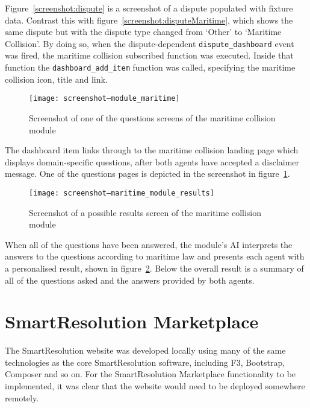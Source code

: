 Figure~\ref{screenshot:dispute} is a screenshot of a dispute populated with fixture data. Contrast this with figure~\ref{screenshot:disputeMaritime}, which shows the same dispute but with the dispute type changed from `Other' to `Maritime Collision'. By doing so, when the dispute-dependent \lstinline{dispute_dashboard} event was fired, the maritime collision subscribed function was executed. Inside that function the \lstinline{dashboard_add_item} function was called, specifying the maritime collision icon, title and link.

\begin{figure}[h!]
  \centering
    \ifimages
    \texttt{[image: screenshot--module\_maritime]}
    \fi
  \caption{Screenshot of one of the questions screens of the maritime collision module}
  \label{screenshot:moduleMaritime}
\end{figure}

The dashboard item links through to the maritime collision landing page which displays domain-specific questions, after both agents have accepted a disclaimer message. One of the questions pages is depicted in the screenshot in figure~\ref{screenshot:moduleMaritime}.

\begin{figure}[h!]
  \centering
    \ifimages
    \texttt{[image: screenshot--maritime\_module\_results]}
    \fi
  \caption{Screenshot of a possible results screen of the maritime collision module}
  \label{screenshot:moduleMaritimeResults}
\end{figure}

When all of the questions have been answered, the module's AI interprets the answers to the questions according to maritime law and presents each agent with a personalised result, shown in figure~\ref{screenshot:moduleMaritimeResults}. Below the overall result is a summary of all of the questions asked and the answers provided by both agents.

\section{SmartResolution Marketplace}

The SmartResolution website was developed locally using many of the same technologies as the core SmartResolution software, including F3, Bootstrap, Composer and so on. For the SmartResolution Marketplace functionality to be implemented, it was clear that the website would need to be deployed somewhere remotely.

